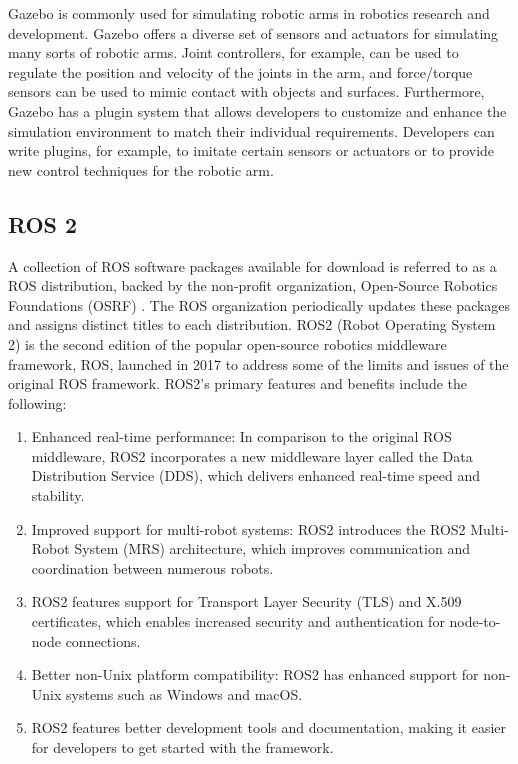\documentclass[12pt,oneside]{article}
\begin{document}
Gazebo is commonly used for simulating robotic arms in robotics research and development. Gazebo offers a diverse set of sensors and actuators for simulating many sorts of robotic arms. Joint controllers, for example, can be used to regulate the position and velocity of the joints in the arm, and force/torque sensors can be used to mimic contact with objects and surfaces. Furthermore, Gazebo has a plugin system that allows developers to customize and enhance the simulation environment to match their individual requirements. Developers can write plugins, for example, to imitate certain sensors or actuators or to provide new control techniques for the robotic arm.

\subsection{ROS 2}
A collection of ROS software packages available for download is referred to as a ROS distribution, backed by the non-profit organization, Open-Source Robotics Foundations (OSRF) \cite{18_ebeid2018survey}. The ROS organization periodically updates these packages and assigns distinct titles to each distribution.
ROS2 (Robot Operating System 2) \cite{40_phueakthong2021development} is the second edition of the popular open-source robotics middleware framework, ROS, launched in 2017 to address some of the limits and issues of the original ROS framework. ROS2's primary features and benefits include the following:
\begin{enumerate}
\item Enhanced real-time performance: In comparison to the original ROS middleware, ROS2 incorporates a new middleware layer called the Data Distribution Service (DDS), which delivers enhanced real-time speed and stability.
\item Improved support for multi-robot systems: ROS2 introduces the ROS2 Multi-Robot System (MRS) architecture, which improves communication and coordination between numerous robots.
\item ROS2 features support for Transport Layer Security (TLS) and X.509 certificates, which enables increased security and authentication for node-to-node connections.
\item Better non-Unix platform compatibility: ROS2 has enhanced support for non-Unix systems such as Windows and macOS.
\item ROS2 features better development tools and documentation, making it easier for developers to get started with the framework.
\end{enumerate}
\end{document}
